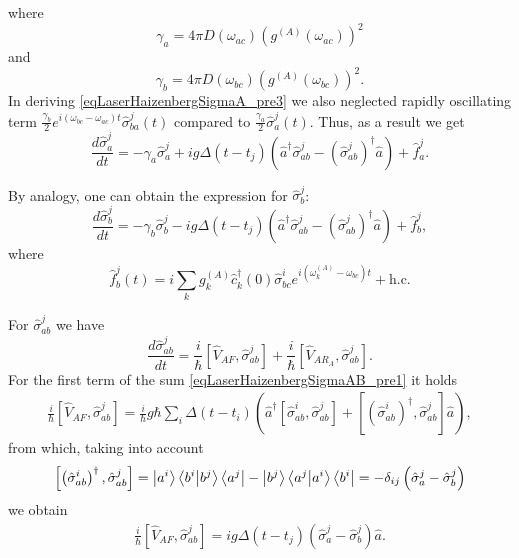 where 
\[
\gamma_{a} = 4 \pi D\left(\omega_{ac}\right)
\left(g^{(A)}\left(\omega_{ac}\right)\right)^2
\]
and
\[
\gamma_{b} = 4 \pi D\left(\omega_{bc}\right)
\left(g^{(A)}\left(\omega_{bc}\right)\right)^2.
\]
In deriving \eqref{eqLaserHaizenbergSigmaA_pre3} we also neglected
rapidly oscillating term 
$\frac{\gamma_{b}}{2}
e^{i\left(\omega_{bc} - \omega_{ac}\right)t}
\hat{\sigma}_{ba}^{j}\left(t\right)$ 
compared to 
$\frac{\gamma_{a}}{2}
\hat{\sigma}_{a}^{j}\left(t\right)$.
Thus, as a result we get
\begin{equation}
\frac{d \hat{\sigma}_a^j}{d t} = 
- \gamma_{a} \hat{\sigma}_{a}^{j} +
i g 
\Delta\left(t - t_j\right) 
 \left(
\hat{a}^{\dag}\hat{\sigma}^{j}_{ab} -
\left(\hat{\sigma}^{j}_{ab}\right)^{\dag}\hat{a}
\right) + \hat{f}_{a}^{j}.
\label{eqLaserHaizenbergSigmaAJ}
\end{equation}

By analogy, one can obtain the expression for $\hat{\sigma}_b^j$:
\begin{equation}
\frac{d \hat{\sigma}_b^j}{d t} = 
- \gamma_{b} \hat{\sigma}_{b}^{j} -
i g 
\Delta\left(t - t_j\right) 
 \left(
\hat{a}^{\dag}\hat{\sigma}^{j}_{ab} -
\left(\hat{\sigma}^{j}_{ab}\right)^{\dag}\hat{a}
\right) + \hat{f}_{b}^{j},
\label{eqLaserHaizenbergSigmaBJ}
\end{equation}
where
\begin{equation}
\hat{f}_{b}^{j}\left(t\right) = i
\sum_{k}
g_k^{(A)}
\hat{c}_k^{\dag}\left(0\right)\hat{\sigma}^{i}_{bc}  
e^{i\left(\omega_k^{(A)} - \omega_{bc}\right)t} + \mbox{h.c.}
\label{eqLaserHaizenbergFBJ}
\end{equation}

For $\hat{\sigma}^{j}_{ab}$ we have
\begin{equation}
\frac{d \hat{\sigma}_{ab}^j}{d t} = 
\frac{i}{\hbar}
\left[\hat{V}_{AF}, \hat{\sigma}_{ab}^j\right] + 
\frac{i}{\hbar}
\left[\hat{V}_{AR_A}, \hat{\sigma}_{ab}^j\right].
\label{eqLaserHaizenbergSigmaAB_pre1}
\end{equation}
For the first term of the sum \eqref{eqLaserHaizenbergSigmaAB_pre1} it holds
\begin{eqnarray}
\frac{i}{\hbar}
\left[\hat{V}_{AF}, \hat{\sigma}_{ab}^j\right] = 
 \frac{i}{\hbar} g \hbar
\sum_i
\Delta\left(t - t_i\right) 
 \left(
\hat{a}^{\dag}\left[\hat{\sigma}^{i}_{ab},\hat{\sigma}_{ab}^j\right]  +
\left[\left(\hat{\sigma}^{i}_{ab}\right)^{\dag},\hat{\sigma}_{ab}^j\right]
\hat{a}
\right),
\nonumber
\end{eqnarray}
from which, taking into account 
\begin{eqnarray}
\left[\left(\hat{\sigma}^{i}_{ab}\right)^{\dag},\hat{\sigma}_{ab}^j\right] = 
\ket{a^i}\bra{b^i}\ket{b^j}\bra{a^j} -
\ket{b^j}\bra{a^j}\ket{a^i}\bra{b^i} = 
- \delta_{ij}\left(\hat{\sigma}^{j}_{a} - \hat{\sigma}^{j}_{b}\right)
\nonumber
\end{eqnarray}
we obtain
\begin{eqnarray}
\frac{i}{\hbar}
\left[\hat{V}_{AF}, \hat{\sigma}_{ab}^j\right] = 
i g 
\Delta\left(t - t_j\right) 
\left(\hat{\sigma}^{j}_{a} -
\hat{\sigma}^{j}_{b}\right)\hat{a}.
\label{eqLaserHaizenbergSigmaAB_pre1_1}
\end{eqnarray}

